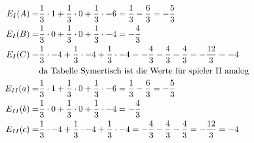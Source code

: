 \documentclass[a4paper, 11pt]{article}
\newcommand{\RM}[1]{\MakeUppercase{\romannumeral #1}}
\begin{document}
\begin{align}
	E_\RM{1}(A) = & \frac{1}{3} \cdot 1 + \frac{1}{3} \cdot 0 + \frac{1}{3} \cdot -6 = \frac{1}{3} - \frac{6}{3} = -\frac{5}{3}\\
	E_\RM{1}(B) = & \frac{1}{3} \cdot 0 + \frac{1}{3} \cdot 0 + \frac{1}{3} \cdot -4 = - \frac{4}{3}\\
	E_\RM{1}(C) = & \frac{1}{3} \cdot -4 + \frac{1}{3} \cdot -4 + \frac{1}{3} \cdot -4 = - \frac{4}{3} - \frac{4}{3} - \frac{4}{3} = -\frac{12}{3} = -4\\
	& \text{da Tabelle Symertisch ist die Werte für spieler \RM{2} analog}\\
	E_\RM{2}(a) = & \frac{1}{3} \cdot 1 + \frac{1}{3} \cdot 0 + \frac{1}{3} \cdot -6 = \frac{1}{3} - \frac{6}{3} = -\frac{5}{3}\\
	E_\RM{2}(b) = & \frac{1}{3} \cdot 0 + \frac{1}{3} \cdot 0 + \frac{1}{3} \cdot -4 = - \frac{4}{3}\\
	E_\RM{2}(c) = & \frac{1}{3} \cdot -4 + \frac{1}{3} \cdot -4 + \frac{1}{3} \cdot -4 = - \frac{4}{3} - \frac{4}{3} - \frac{4}{3} = -\frac{12}{3} = -4
\end{align}
\end{document}
